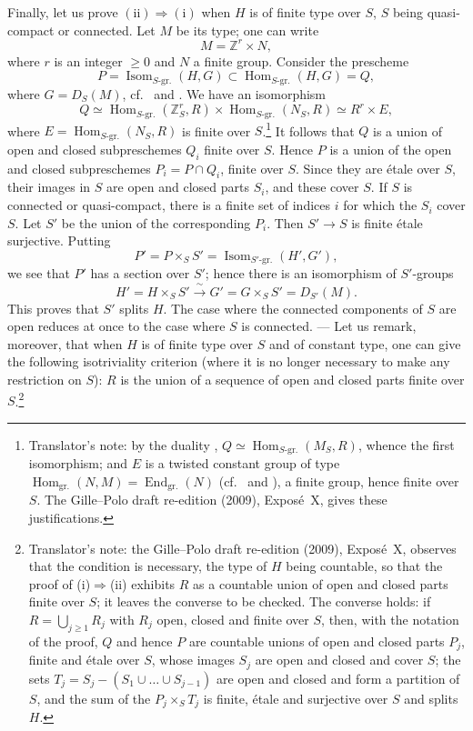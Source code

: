 Finally, let us prove \(\mathrm{(ii)}\Rightarrow\mathrm{(i)}\) when \(H\) is
of finite type over \(S\), \(S\) being quasi-compact or connected. Let \(M\)
be its type; one can write
\[
  M=\mathbb Z^r\times N,
\]
where \(r\) is an integer \(\geq0\) and \(N\) a finite group. Consider the
prescheme
\[
  P=\operatorname{Isom}_{S\text{-gr.}}(H,G)
  \subset
  \operatorname{Hom}_{S\text{-gr.}}(H,G)=Q,
\]
where \(G=D_S(M)\), cf.\  and . We have an isomorphism
\[
  Q\simeq
  \operatorname{Hom}_{S\text{-gr.}}(\mathbb Z^r_S,R)
  \times
  \operatorname{Hom}_{S\text{-gr.}}(N_S,R)
  \simeq R^r\times E,
\]
where \(E=\operatorname{Hom}_{S\text{-gr.}}(N_S,R)\) is finite over
\(S\).\footnote{Translator's note: by the duality ,
\(Q\simeq\operatorname{Hom}_{S\text{-gr.}}(M_S,R)\), whence the first
isomorphism; and \(E\) is a twisted constant group of type
\(\operatorname{Hom}_{\mathrm{gr.}}(N,M)=\operatorname{End}_{\mathrm{gr.}}(N)\)
(cf.\  and ), a finite group, hence finite over \(S\). The
Gille--Polo draft re-edition (2009), Expos\'e~X, gives these
justifications.} It follows that \(Q\) is a union of open and closed
subpreschemes \(Q_i\) finite over \(S\). Hence \(P\) is a union of the open
and closed subpreschemes \(P_i=P\cap Q_i\), finite over \(S\). Since they
are étale over \(S\), their images in \(S\) are open and closed parts
\(S_i\), and these cover \(S\). If \(S\) is connected or quasi-compact,
there is a finite set of indices \(i\) for which the \(S_i\) cover \(S\).
Let \(S'\) be the union of the corresponding \(P_i\). Then
\(S'\to S\) is finite étale surjective. Putting
\[
  P'=P\times_S S'
     =\operatorname{Isom}_{S'\text{-gr.}}(H',G'),
\]
we see that \(P'\) has a section over \(S'\); hence there is an isomorphism
of \(S'\)-groups
\[
  H'=H\times_S S'
  \xrightarrow{\ \sim\ }
  G'=G\times_S S'=D_{S'}(M).
\]
This proves that \(S'\) splits \(H\). The case where the connected
components of \(S\) are open reduces at once to the case where \(S\) is
connected. --- Let us remark, moreover, that when \(H\) is of finite type
over \(S\) and of constant type, one can give the following isotriviality
criterion (where it is no longer necessary to make any restriction on
\(S\)): \(R\) is the union of a sequence of open and closed parts finite over
\(S\).\footnote{Translator's note: the Gille--Polo draft re-edition (2009),
Expos\'e~X, observes that the condition is necessary, the type of \(H\) being
countable, so that the proof of (i)\(\Rightarrow\)(ii) exhibits \(R\) as a
countable union of open and closed parts finite over \(S\); it leaves the
converse to be checked. The converse holds: if \(R=\bigcup_{j\geq1}R_j\) with
\(R_j\) open, closed and finite over \(S\), then, with the notation of the
proof, \(Q\) and hence \(P\) are countable unions of open and closed parts
\(P_j\), finite and étale over \(S\), whose images \(S_j\) are open and closed
and cover \(S\); the sets \(T_j=S_j-(S_1\cup\dots\cup S_{j-1})\) are open and
closed and form a partition of \(S\), and the sum of the
\(P_j\times_ST_j\) is finite, étale and surjective over \(S\) and splits
\(H\).}

